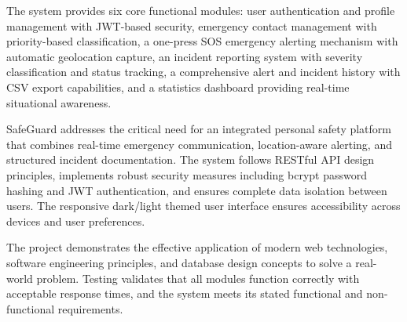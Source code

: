 \begin{center}
\begin{minipage}{0.85\textwidth}
    \vspace{0.5cm}

    \noindent The system provides six core functional modules: user authentication and profile management with JWT-based security, emergency contact management with priority-based classification, a one-press SOS emergency alerting mechanism with automatic geolocation capture, an incident reporting system with severity classification and status tracking, a comprehensive alert and incident history with CSV export capabilities, and a statistics dashboard providing real-time situational awareness.

    \vspace{0.5cm}

    \noindent SafeGuard addresses the critical need for an integrated personal safety platform that combines real-time emergency communication, location-aware alerting, and structured incident documentation. The system follows RESTful API design principles, implements robust security measures including bcrypt password hashing and JWT authentication, and ensures complete data isolation between users. The responsive dark/light themed user interface ensures accessibility across devices and user preferences.

    \vspace{0.5cm}

    \noindent The project demonstrates the effective application of modern web technologies, software engineering principles, and database design concepts to solve a real-world problem. Testing validates that all modules function correctly with acceptable response times, and the system meets its stated functional and non-functional requirements.

  \end{minipage}
\end{center}
